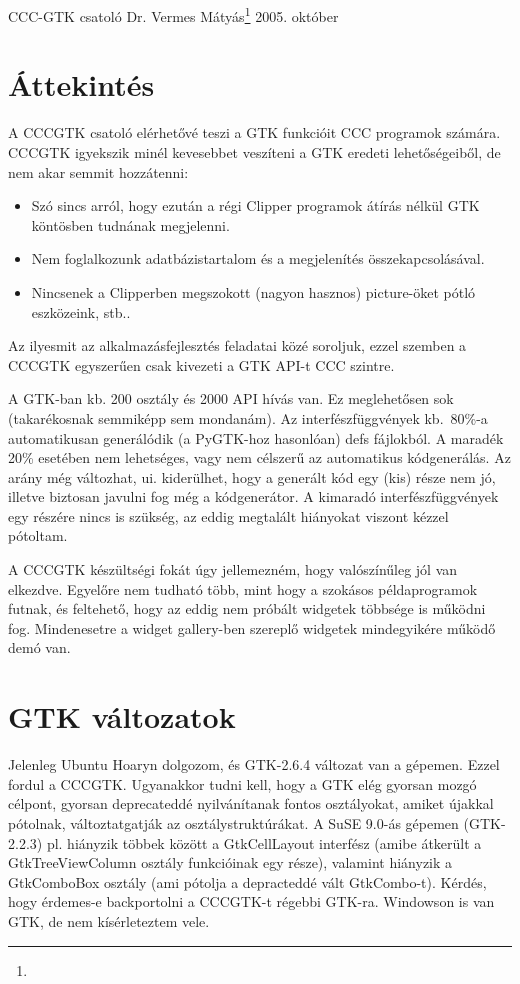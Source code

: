 
\pagetitle%
{CCC-GTK csatoló}%
{Dr. Vermes Mátyás\footnote{\ComFirm}}%
{2005. október}


\section{Áttekintés}
A CCCGTK  csatoló  elérhetővé teszi a GTK funkcióit CCC programok számára.
CCCGTK igyekszik minél kevesebbet veszíteni a GTK eredeti lehetőségeiből, 
de nem akar semmit hozzátenni:
\begin{itemize}
\item 
    Szó sincs arról, hogy ezután a régi Clipper programok
    átírás nélkül GTK köntösben tudnának megjelenni.
\item
    Nem foglalkozunk adatbázistartalom és a megjelenítés
    összekapcsolásával.
\item
    Nincsenek a Clipperben megszokott (nagyon hasznos) 
    picture-öket pótló eszközeink, stb..     
\end{itemize}
Az ilyesmit az alkalmazásfejlesztés feladatai közé soroljuk,
ezzel szemben a CCCGTK egyszerűen csak kivezeti a GTK API-t CCC szintre.

A GTK-ban kb. 200 osztály és 2000 API hívás van. 
Ez meglehetősen sok (takarékosnak semmiképp sem mondanám).
Az interfészfüggvények kb.~80\%-a automatikusan generálódik
(a PyGTK-hoz hasonlóan) defs fájlokból. A maradék 20\% esetében
nem lehetséges, vagy nem célszerű az automatikus kódgenerálás.
Az arány még változhat, ui. kiderülhet, hogy a generált
kód egy (kis) része nem jó, illetve biztosan javulni fog még 
a kódgenerátor. A kimaradó interfészfüggvények egy részére nincs 
is szükség, az eddig megtalált hiányokat viszont kézzel pótoltam.

A CCCGTK készültségi fokát úgy jellemezném, hogy valószínűleg 
jól van elkezdve. Egyelőre nem tudható több, mint hogy a szokásos 
példaprogramok futnak, és feltehető, hogy az eddig nem próbált 
widgetek többsége is működni fog. Mindenesetre a widget gallery-ben
szereplő widgetek mindegyikére működő demó van.


\section{GTK változatok}
Jelenleg Ubuntu Hoaryn dolgozom, és GTK-2.6.4 változat van a gépemen. 
Ezzel fordul a CCCGTK. Ugyanakkor tudni kell, hogy a GTK elég gyorsan 
mozgó célpont, gyorsan deprecateddé nyilvánítanak fontos osztályokat, 
amiket újakkal pótolnak, változtatgatják az osztálystruktúrákat.
A SuSE 9.0-ás gépemen (GTK-2.2.3) 
pl. hiányzik többek között a GtkCellLayout interfész
(amibe átkerült a GtkTreeViewColumn osztály funkcióinak egy része),
valamint hiányzik a GtkComboBox osztály (ami pótolja a depracteddé
vált GtkCombo-t). Kérdés, hogy érdemes-e backportolni a CCCGTK-t
régebbi GTK-ra. Windowson is van GTK, de nem kísérleteztem vele.



